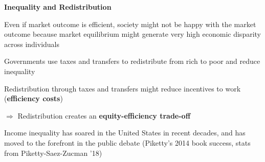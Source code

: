\documentclass[landscape]{slides}
\begin{document}
\begin{slide}
\begin{center}
{\bf Inequality and Redistribution}
\end{center}

Even if market outcome is efficient, society might not be
happy with the market outcome because market equilibrium
might generate very high economic disparity across individuals

Governments use taxes and transfers to redistribute 
from rich to poor and reduce inequality

Redistribution through taxes and transfers might reduce
incentives to work (\textbf{efficiency costs})

$\Rightarrow$ 
Redistribution creates an \textbf{equity-efficiency trade-off}

Income inequality has soared in the
United States in recent decades, and has moved to the forefront
in the public debate (Piketty's 2014 book success, stats from Piketty-Saez-Zucman '18)

\end{slide}


\begin{slide}

\end{slide}

%
%
%
%
%
\end{document}
